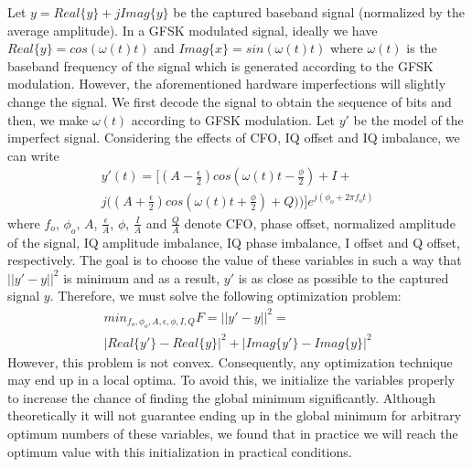 Let $y = Real\{y\}+jImag\{y\}$ be the captured baseband signal (normalized by the average amplitude). In a GFSK modulated signal, ideally we have $Real\{y\} = cos(\omega(t)t)$ and $Imag\{x\} = sin(\omega(t)t)$ where $\omega(t)$ is the baseband frequency of the signal which is generated according to the GFSK modulation. However, the aforementioned hardware imperfections will slightly change the signal. We first decode the signal to obtain the sequence of bits and then, we make $\omega(t)$ according to GFSK modulation. Let $y'$ be the model of the imperfect signal. Considering the effects of CFO, IQ offset and IQ imbalance, we can write
\begin{gather*}
    y'(t) = \big[(A-\frac{\epsilon}{2})cos(\omega(t)t-\frac{\phi}{2})+I+ \\
    j\big((A+\frac{\epsilon}{2})cos(\omega(t)t+\frac{\phi}{2})+Q)\big)\big]e^{j(\phi_o+2\pi f_o t)}
\end{gather*}
where $f_o$, $\phi_o$, $A$, $\frac{\epsilon}{A}$, $\phi$, $\frac{I}{A}$ and $\frac{Q}{A}$ denote CFO, phase offset, normalized amplitude of the signal, IQ amplitude imbalance, IQ phase imbalance, I offset and Q offset, respectively. The goal is to choose the value of these variables in such a way that $||y'-y||^2$ is minimum and as a result, $y'$ is as close as possible to the captured signal $y$. Therefore, we must solve the following optimization problem:
\begin{gather*}
    min_{f_o,\phi_o,A,\epsilon,\phi,I,Q}{F=||y'-y||^2 =} \\ |Real\{y'\}-Real\{y\}|^2+|Imag\{y'\}-Imag\{y\}|^2
\end{gather*}
However, this problem is not convex. Consequently, any optimization technique may end up in a local optima. To avoid this, we initialize the variables properly to increase the chance of finding the global minimum significantly. Although theoretically it will not guarantee ending up in the global minimum for arbitrary optimum numbers of these variables, we found that in practice we will reach the optimum value with this initialization in practical conditions. 

